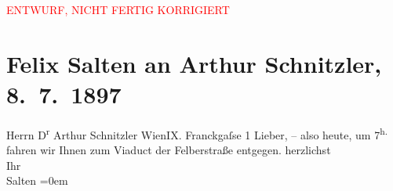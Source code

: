 
\begin{center}
            \textcolor{red}{ENTWURF, NICHT FERTIG KORRIGIERT}
                      \end{center}
            
         \renewcommand{\erwaehnteOrte}{Orte: Felberstraße, Frankgasse, IX., Alsergrund, Penzinger Viadukt, Wien}
         \renewcommand{\erwaehnteWerke}{}
               \section[Felix Salten an Arthur Schnitzler, 8. 7. 1897]{ Felix Salten an Arthur Schnitzler, 8. 7. 1897}\nopagebreak{}\rehead{ }\begin{ledgroupsized}[t]{13cm}\normalsize\beginnumbering \toendnotes[C]{\smallbreak\pagebreak[2]} 
\pstart{}{\pb}Herrn D\textsuperscript{r} Arthur Schnitzler \pend{}\pstart{}Wien\pend{}\pstart{}IX. Franckgaſse 1\pend{}{\bigskip}\pstart
           \noindent{}{\pb}Lieber, – also heute, um 7\textsuperscript{h.} fahren wir Ihnen zum Viaduct der Felberstraße entgegen. \pend
           \pstart
           herzlichst{\\[\baselineskip]}Ihr{\\[\baselineskip]}\spacefill\mbox{Salten}\pend
           \leftskip=0em{}
         
         \endnumbering{}\end{ledgroupsized}\begin{anhang}\end{anhang}\newcommand{\dateiname}{L02761}\newcommand{\titel}{Felix Salten an Arthur Schnitzler, 8. 7. 1897}\newcommand{\editorInnen}{Martin Anton Müller und Laura Untner}
      